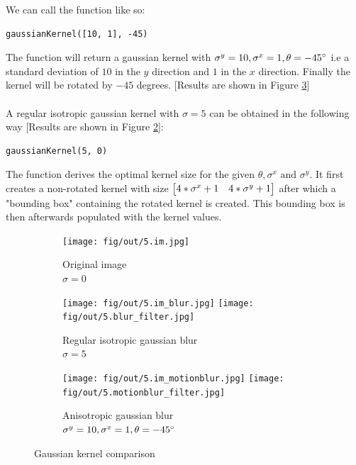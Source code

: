 \documentclass[tikz,14pt,fleqn]{article}
\begin{document}
We can call the function like so:
\vspace*{-0.5cm}
\begin{verbatim} 
gaussianKernel([10, 1], -45)
\end{verbatim}
\vspace*{-0.5cm}
The function will return a gaussian kernel with $\sigma^y=10, \sigma^x=1,\theta=-45\degree$ i.e a standard deviation of $10$ in the $y$ direction and $1$ in the $x$ direction. Finally the kernel will be rotated by $-45$ degrees. [Results are shown in Figure \ref{fig:5.3}]\\\\
A regular isotropic gaussian kernel with $\sigma=5$ can be obtained in the following way [Results are shown in Figure \ref{fig:5.2}]:
\vspace*{-0.5cm}
\begin{verbatim} 
gaussianKernel(5, 0)
\end{verbatim}
The function derives the optimal kernel size for the given $\theta,\sigma^x\text{ and }\sigma^y$. It first creates a non-rotated kernel with size $ \begin{bmatrix} 4*\sigma^x+1 & 4*\sigma^y+1 \end{bmatrix} $ after which a "bounding box" containing the rotated kernel is created. This bounding box is then afterwards populated with the kernel values.\\
\vspace*{-0.5cm}
\begin{figure}[h!]
    \centering
    \begin{subfigure}[b]{0.28\linewidth}
        \centering
        \texttt{[image: fig/out/5.im.jpg]}
        \caption{Original image\\$\sigma=0$}
        \label{fig:5.1}
    \end{subfigure}
    \begin{subfigure}[b]{0.28\linewidth}
        \centering
        \texttt{[image: fig/out/5.im\_blur.jpg]}
        \texttt{[image: fig/out/5.blur\_filter.jpg]}
        \caption{Regular isotropic gaussian blur\\$\sigma=5$}
        \label{fig:5.2}
    \end{subfigure}
    \begin{subfigure}[b]{0.28\linewidth}
        \centering
        \texttt{[image: fig/out/5.im\_motionblur.jpg]}
        \texttt{[image: fig/out/5.motionblur\_filter.jpg]}
        \caption{Anisotropic gaussian blur\\$\sigma^y=10, \sigma^x=1,\theta=-45\degree$}
        \label{fig:5.3}
    \end{subfigure}
    \caption{Gaussian kernel comparison}
    \label{fig:5}
\end{figure}
\end{document}
